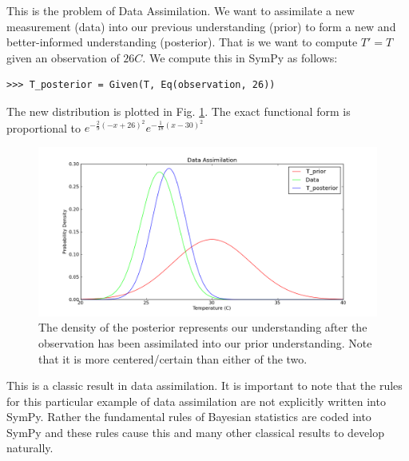 This is the problem of Data Assimilation. We want to assimilate a new
measurement (data) into our previous understanding (prior) to form a new and
better-informed understanding (posterior). That is we want to compute $T' = T$
given an observation of $26C$. We compute this in SymPy as follows:

\begin{lstlisting}
>>> T_posterior = Given(T, Eq(observation, 26))
\end{lstlisting}

The new distribution is plotted in Fig. \ref{fig:DA_posterior}. The exact
functional form is proportional to $e^{-\frac{2}{9} \left(-x + 26\right)^{2}}
e^{-\frac{1}{18} \left(x-30\right)^{2}}$

\begin{figure}[ht]
\vspace{-0pt}
\centering
\includegraphics[width=.7\textwidth]{images/posterior.png}
\vspace{-0pt}
\caption{The density of the posterior represents our understanding after the observation has been assimilated into our prior understanding. Note that it is more centered/certain than either of the two. }
\label{fig:DA_posterior}
\vspace{00pt}
\end{figure}

This is a classic result in data assimilation. It is important to note that
the rules for this particular example of data assimilation are not explicitly written into SymPy. Rather the fundamental rules of Bayesian statistics are coded into SymPy and these rules cause this and many other classical results to develop naturally.
